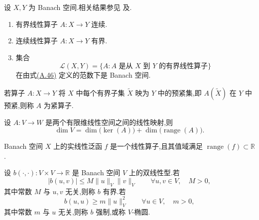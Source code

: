 \begin{lemma}[有界线性算子的性质]\label{lem:appendix-a-62}
设 $X,Y$ 为 Banach 空间.相关结果参见\textcite[第 4.5.2、4.5.3 节]{KolmogorovFomin1975} 及\textcite[第 43 页]{Yosida1995}.
\begin{enumerate}[label=(\roman*)]
 \item 有界线性算子 $A:X\to Y$ 连续.
 \item 连续线性算子 $A:X\to Y$ 有界.
 \item 集合
 \[
  \mathcal L(X,Y)=\{A:A\text{ 是从 }X\text{ 到 }Y\text{ 的有界线性算子}\}
 \]
 在由式\hyperref[eq:appendix-a-46]{(A.46)} 定义的范数下是 Banach 空间.
\end{enumerate}
\end{lemma}

\begin{definition}[紧算子]\label{def:appendix-a-63}
若算子 $A:X\to Y$ 将 $X$ 中每个有界子集 $\widetilde X$ 映为 $Y$ 中的预紧集,即 $A(\widetilde X)$ 在 $Y$ 中预紧,则称 $A$ 为紧算子.
\end{definition}

\begin{theorem}[秩--零度定理]\label{thm:appendix-a-64}\label{thm:rank-nullity}
设 $A:V\to W$ 是两个有限维线性空间之间的线性映射,则
\[
 \dim V=\dim\bigl(\ker(A)\bigr)+\dim\bigl(\operatorname{range}(A)\bigr).
\]
\end{theorem}

\begin{definition}[线性泛函]\label{def:appendix-a-65}
Banach 空间 $X$ 上的实线性泛函 $f$ 是一个线性算子,且其值域满足 $\operatorname{range}(f)\subset\mathbb R$.
\end{definition}

\begin{definition}\label{def:appendix-a-66}
设 $b(\cdot,\cdot):V\times V\to\mathbb R$ 是 Banach 空间 $V$ 上的双线性型.若
\begin{equation}\label{eq:appendix-a-47}
 |b(u,v)|\le M\|u\|_V\|v\|_V\qquad\forall u,v\in V,\quad M>0,
\end{equation}
其中常数 $M$ 与 $u,v$ 无关,则称 $b$ 有界.若
\begin{equation}\label{eq:appendix-a-48}
 b(u,u)\ge m\|u\|_V^2\qquad\forall u\in V,\quad m>0,
\end{equation}
其中常数 $m$ 与 $u$ 无关,则称 $b$ 强制,或称 $V$-椭圆.
\end{definition}

